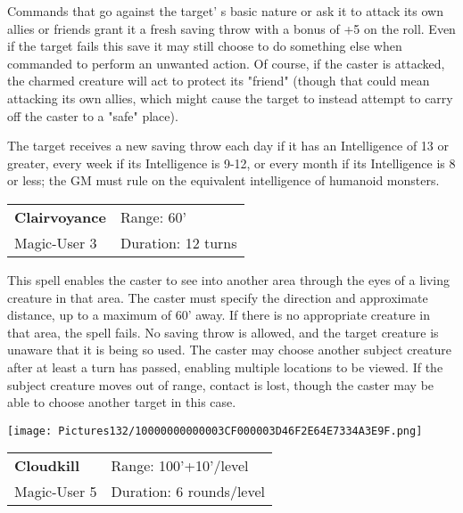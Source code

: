 \documentclass[a4paper,twoside,openany,10pt]{book}
\begin{document}
\begin{multicols}{2}
Commands that go against the target' s basic nature or ask it to attack its own allies or friends grant it a fresh saving throw with a bonus of +5 on the roll. Even if the target fails this save it may still choose to do something else when commanded to perform an unwanted action. Of course, if the caster is attacked, the charmed creature will act to protect its "friend" (though that could mean attacking its own allies, which might cause the target to instead attempt to carry off the caster to a "safe" place).

The target receives a new saving throw each day if it has an Intelligence of 13 or greater, every week if its Intelligence is 9-12, or every month if its Intelligence is 8 or less; the GM must rule on the equivalent intelligence of humanoid monsters.\medskip


\smallskip\begin{flushleft} 
	\begin{tabularx}{0.45\textwidth}{@{}m{3.5cm}m{5.5cm}@{}} 
		\textbf{Clairvoyance} & Range: 60'\\
		Magic-User 3 & Duration: 12 turns\\	
	\end{tabularx}\end{flushleft}

This spell enables the caster to see into another area through the eyes of a living creature in that area. The caster must specify the direction and approximate distance, up to a maximum of 60'{} away. If there is no appropriate creature in that area, the spell fails. No saving throw is allowed, and the target creature is unaware that it is being so used. The caster may choose another subject creature after at least a turn has passed, enabling multiple locations to be viewed. If the subject creature moves out of range, contact is lost, though the caster may be able to choose another target in this case.


\begin{flushleft}	
	\texttt{[image: Pictures132/10000000000003CF000003D46F2E64E7334A3E9F.png]}
\end{flushleft}

\smallskip\begin{flushleft} 
	\begin{tabularx}{0.45\textwidth}{@{}m{3.5cm}m{5.5cm}@{}} 
		\textbf{Cloudkill} & Range: 100'+10'/level\\
		Magic-User 5 & Duration: 6 rounds/level\\	
	\end{tabularx}\end{flushleft}


\end{multicols}
\end{document}
